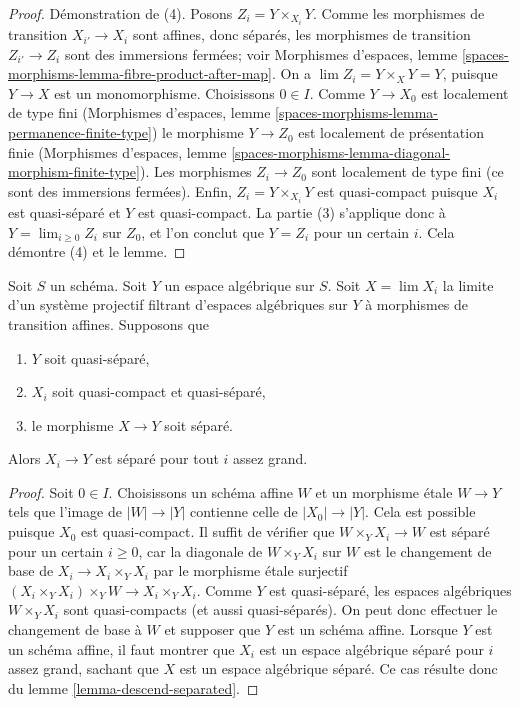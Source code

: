 \begin{proof}
\medskip\noindent
Démonstration de (4). Posons $Z_i = Y \times_{X_i} Y$.
Comme les morphismes de transition $X_{i'} \to X_i$ sont affines, donc
séparés, les morphismes de transition $Z_{i'} \to Z_i$ sont des immersions
fermées; voir Morphismes d'espaces, lemme
\ref{spaces-morphisms-lemma-fibre-product-after-map}.
On a $\lim Z_i = Y \times_X Y = Y$, puisque $Y \to X$ est un monomorphisme.
Choisissons $0 \in I$. Comme $Y \to X_0$ est localement de type fini
(Morphismes d'espaces, lemme
\ref{spaces-morphisms-lemma-permanence-finite-type})
le morphisme $Y \to Z_0$ est localement de présentation finie
(Morphismes d'espaces, lemme
\ref{spaces-morphisms-lemma-diagonal-morphism-finite-type}).
Les morphismes $Z_i \to Z_0$ sont localement de type fini
(ce sont des immersions fermées).
Enfin, $Z_i = Y \times_{X_i} Y$ est quasi-compact puisque
$X_i$ est quasi-séparé et $Y$ est quasi-compact.
La partie (3) s'applique donc à $Y = \lim_{i \geq 0} Z_i$ sur $Z_0$,
et l'on conclut que $Y = Z_i$ pour un certain $i$. Cela démontre (4) et le lemme.
\end{proof}

\begin{lemma}
\label{lemma-eventually-separated}
Soit $S$ un schéma. Soit $Y$ un espace algébrique sur $S$.
Soit $X = \lim X_i$ la limite d'un système projectif filtrant d'espaces
algébriques sur $Y$ à morphismes de transition affines. Supposons que
\begin{enumerate}
\item $Y$ soit quasi-séparé,
\item $X_i$ soit quasi-compact et quasi-séparé,
\item le morphisme $X \to Y$ soit séparé.
\end{enumerate}
Alors $X_i \to Y$ est séparé pour tout $i$ assez grand.
\end{lemma}

\begin{proof}
Soit $0 \in I$. Choisissons un schéma affine $W$ et un morphisme étale
$W \to Y$ tels que l'image de $|W| \to |Y|$ contienne celle de
$|X_0| \to |Y|$. Cela est possible puisque $X_0$ est quasi-compact.
Il suffit de vérifier que $W \times_Y X_i \to W$ est séparé
pour un certain $i \geq 0$, car la diagonale de $W \times_Y X_i$
sur $W$ est le changement de base de $X_i \to X_i \times_Y X_i$ par
le morphisme étale surjectif $(X_i \times_Y X_i) \times_Y W \to
X_i \times_Y X_i$. Comme $Y$ est quasi-séparé, les espaces algébriques
$W \times_Y X_i$ sont quasi-compacts (et aussi quasi-séparés).
On peut donc effectuer le changement de base à $W$ et supposer que $Y$ est un schéma affine.
Lorsque $Y$ est un schéma affine, il faut montrer que $X_i$ est un espace
algébrique séparé pour $i$ assez grand, sachant que $X$ est un espace
algébrique séparé. Ce cas résulte donc du
lemme \ref{lemma-descend-separated}.
\end{proof}

